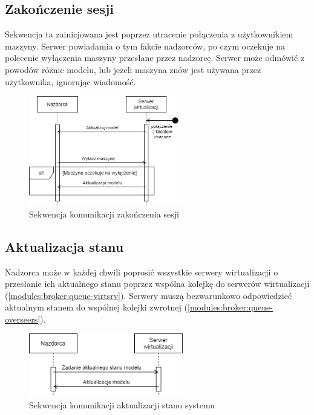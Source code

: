 \documentclass[../opis-rozwiazania.tex]{subfiles}
\begin{document}
\subsection{Zakończenie sesji}

Sekwencja ta zainicjowana jest poprzez utracenie połączenia z użytkownikiem maszyny.
Serwer powiadamia o tym fakcie nadzorców, po czym oczekuje na polecenie wyłączenia maszyny przesłane przez nadzorcę. Serwer może odmówić z powodów różnic modelu, lub jeżeli maszyna znów jest używana przez użytkownika, ignorując wiadomość.

\begin{figure}[H]
    \centering
    \includegraphics[width=0.6\textwidth]{../diagrams/sequence_diagrams/konczenie_sesji.png}
    \caption{Sekwencja komunikacji zakończenia sesji}
    \label{figure:diagrams:sequence_diagrams:konczenie_sesji}
\end{figure}

\subsection{Aktualizacja stanu}

Nadzorca może w każdej chwili poprosić wszystkie serwery wirtualizacji
o przesłanie ich aktualnego stanu poprzez wspólna kolejkę do serwerów wirtualizacji (\ref{modules:broker:queue-virtsrv}).
Serwery muszą bezwarunkowo odpowiedzieć aktualnym stanem do wspólnej kolejki zwrotnej (\ref{modules:broker:queue-overseers}).

\begin{figure}[H]
    \centering
    \includegraphics[width=0.6\textwidth]{../diagrams/sequence_diagrams/aktualizacja_stanu.png}
    \caption{Sekwencja komunikacji aktualizacji stanu systemu}
    \label{figure:diagrams:sequence_diagrams:aktualizacja_stanu}
\end{figure}
\end{document}
